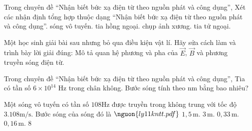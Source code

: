 \begin{ex}
Trong chuyên đề “Nhận biết bức xạ điện từ theo nguồn phát và công dụng”, Xét các nhận định tổng hợp thuộc dạng “Nhận biết bức xạ điện từ theo nguồn phát và công dụng”.
\choiceTF
{\True sóng vô tuyến.}
{\True tia hồng ngoại.}
{\True chụp ảnh xương.}
{tia tử ngoại.}
\end{ex}

\begin{ex}
Một học sinh giải bài sau nhưng bỏ qua điều kiện vật lí. Hãy sửa cách làm và trình bày lời giải đúng: Mô tả quan hệ phương và pha của $\vec E$, $\vec B$ và phương truyền sóng điện từ.
\choiceTF

\end{ex}

\begin{ex}
Trong chuyên đề “Nhận biết bức xạ điện từ theo nguồn phát và công dụng”, Tia có tần số $6\times10^{14}$ Hz trong chân không. Bước sóng tính theo nm bằng bao nhiêu?
\end{ex}

\begin{ex}
Một sóng vô tuyến có tần số $108 \mathrm{Hz}$ được truyền trong không trung với tốc độ $3.108 \mathrm{m/s}$. Bước sóng của sóng đó là $\nguon{ly11 kntt.pdf}$
\choice
{$1,5\,\text{m}$.}
{\True $3\,\text{m}$.}
{$0,33\,\text{m}$.}
{$0,16\,\text{m}$. 8}
\end{ex}


